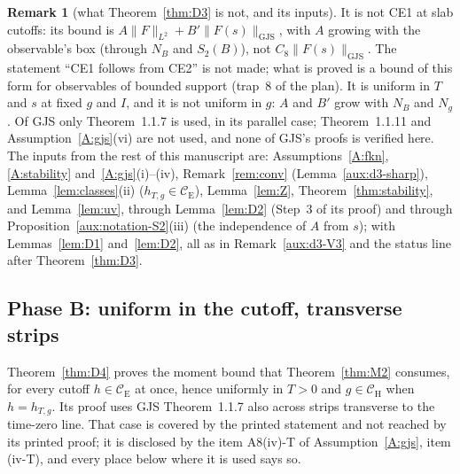 \documentclass[11pt,a4paper]{article}
\theoremstyle{plain}
\theoremstyle{definition}
\theoremstyle{plain}
\theoremstyle{definition}
\newtheorem{auxrem}[auxlemma]{Remark}
\newcommand{\CE}{\mathcal{C}_{\mathrm E}}
\newcommand{\CH}{\mathcal{C}_{\mathrm H}}
\newcommand{\GJS}[1]{\lVert #1\rVert_{\mathrm{GJS}}}   %
\begin{document}
\begin{auxrem}[what Theorem~\ref{thm:D3} is not, and its inputs]\label{aux:d3-not}
It is not CE1 at slab cutoffs: its bound is $A\|F\|_{L^2}+B'\GJS{F(s)}$, with $A$ growing with
the observable's box (through $N_B$ and $S_2(B)$), not $C_8\GJS{F(s)}$.  The statement ``CE1
follows from CE2'' is not made; what is proved is a bound of this form for observables of bounded
support (trap~8 of the plan).  It is uniform in $T$ and $s$ at fixed $g$ and $I$, and it is not
uniform in $g$: $A$ and $B'$ grow with $N_B$ and $N_g$.  Of GJS only Theorem~1.1.7 is used, in its
parallel case; Theorem~1.1.11 and Assumption~\ref{A:gjs}(vi) are not used, and none of GJS's proofs is
verified here.  The inputs from the rest of this manuscript are: Assumptions~\ref{A:fkn}, \ref{A:stability} and~\ref{A:gjs}(i)--(iv), Remark~\ref{rem:conv}
(Lemma~\ref{aux:d3-sharp}), Lemma~\ref{lem:classes}(ii) ($h_{T,g}\in\CE$), Lemma~\ref{lem:Z}, Theorem~\ref{thm:stability}, and
Lemma~\ref{lem:uv}, through Lemma~\ref{lem:D2} (Step~3 of its proof) and through
Proposition~\ref{aux:notation-S2}(iii) (the independence of $A$ from $s$); with Lemmas~\ref{lem:D1}
and~\ref{lem:D2}, all as in Remark~\ref{aux:d3-V3} and the status line
after Theorem~\ref{thm:D3}.
\end{auxrem}

\subsection{Phase B: uniform in the cutoff, transverse strips}\label{sec:d4}

Theorem~\ref{thm:D4} proves the moment bound that Theorem~\ref{thm:M2} consumes, for every
cutoff $h\in\CE$ at once, hence uniformly in $T>0$ and $g\in\CH$ when $h=h_{T,g}$.  Its proof
uses GJS Theorem~1.1.7 also across strips transverse to the time-zero line.  That case is
covered by the printed statement and not reached by its printed proof; it is disclosed by the
item A8(iv)-T of Assumption~\ref{A:gjs}, item (iv-T), and every place below where it is used says so.
\end{document}
